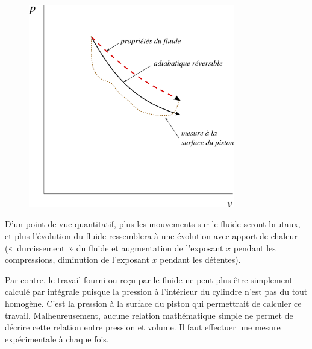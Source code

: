 		\begin{figure}
			\begin{center}
			\includegraphics[width=9cm]{images/pv_detente_irreversible.png}
			\end{center}
			\label{fig_p-v_détente_irr}
		\end{figure}

		D’un point de vue quantitatif, plus les mouvements sur le fluide seront brutaux, et plus l’évolution du fluide ressemblera à une évolution avec apport de chaleur («~durcissement~» du fluide et augmentation de l’exposant $x$ pendant les compressions, diminution de l’exposant $x$ pendant les détentes).

		Par contre, le travail fourni ou reçu par le fluide ne peut plus être simplement calculé par intégrale puisque la pression à l’intérieur du cylindre n’est pas du tout homogène. C’est la pression à la surface du piston qui permettrait de calculer ce travail. Malheureusement, aucune relation mathématique simple ne permet de décrire cette relation entre pression et volume. Il faut effectuer une mesure expérimentale à chaque fois.
		
